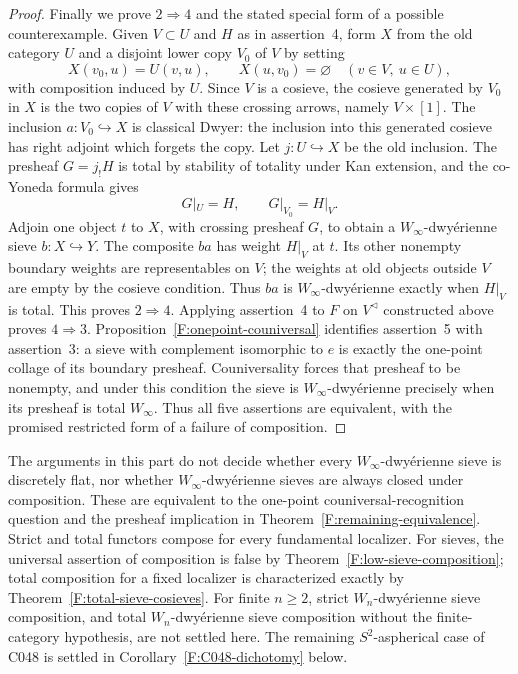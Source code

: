\begin{proof}
Finally we prove $2\Rightarrow4$ and the stated special form
of a possible counterexample. Given $V\subset U$ and $H$ as
in assertion~4, form $X$ from the old category $U$ and a
disjoint lower copy $V_0$ of $V$ by setting
\[
 X(v_0,u)=U(v,u),\qquad X(u,v_0)=\varnothing
       \quad(v\in V,\ u\in U),
\]
with composition induced by $U$. Since $V$ is a cosieve,
the cosieve generated by $V_0$ in $X$ is the two copies of
$V$ with these crossing arrows, namely $V\times[1]$.
The inclusion $a:V_0\hookrightarrow X$ is classical Dwyer:
the inclusion into this generated cosieve has right adjoint
which forgets the copy. Let $j:U\hookrightarrow X$ be the
old inclusion. The presheaf $G=j_!H$ is total by stability
of totality under Kan extension, and the co-Yoneda formula
gives
\[
 G|_U=H,\qquad G|_{V_0}=H|_V.
\]
Adjoin one object $t$ to $X$, with crossing presheaf $G$,
to obtain a $W_\infty$-dwy\'erienne sieve $b:X\hookrightarrow Y$.
The composite $ba$ has weight $H|_V$ at $t$. Its other
nonempty boundary weights are representables on $V$;
the weights at old objects outside $V$ are empty by the
cosieve condition. Thus $ba$ is $W_\infty$-dwy\'erienne
exactly when $H|_V$ is total. This proves $2\Rightarrow4$.
Applying assertion~4 to $F$ on $V^{\triangleleft}$ constructed
above proves $4\Rightarrow3$.
Proposition~\ref{F:onepoint-couniversal} identifies assertion~5
with assertion~3: a sieve with complement isomorphic to $e$
is exactly the one-point collage of its boundary presheaf. Couniversality
forces that presheaf to be nonempty, and under this condition
the sieve is $W_\infty$-dwy\'erienne precisely when its
presheaf is total $W_\infty$. Thus all five assertions are equivalent, with
the promised restricted form of a failure of composition.
\end{proof}

\begin{proposition}\label{F:open}
The arguments in this part do not decide
whether every $W_\infty$-dwy\'erienne sieve is
discretely flat, nor whether
$W_\infty$-dwy\'erienne sieves are always closed
under composition. These are equivalent to the
one-point couniversal-recognition question and the
presheaf implication in
Theorem~\ref{F:remaining-equivalence}. Strict and
total functors compose for every fundamental
localizer. For sieves, the universal assertion
of composition is false by
Theorem~\ref{F:low-sieve-composition}; total
composition for a fixed localizer is characterized
exactly by Theorem~\ref{F:total-sieve-cosieves}.
For finite $n\geq2$, strict $W_n$-dwy\'erienne
sieve composition, and total $W_n$-dwy\'erienne
sieve composition without the finite-category
hypothesis, are not settled here. The remaining
$S^2$-aspherical case of C048 is settled in
Corollary~\ref{F:C048-dichotomy} below.
\end{proposition}

